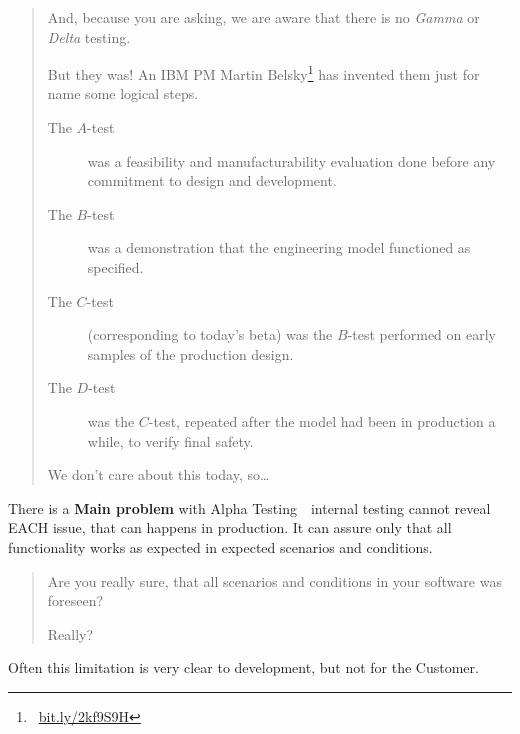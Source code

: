 \begin{quote}
And, because you are asking, we are aware that there is no \emph{Gamma} or \emph{Delta} testing. 

But they was! An IBM PM Martin Belsky\footnote{~\href{http://bit.ly/2kf9S9H}{bit.ly/2kf9S9H}} has invented them just for name some logical steps.

\begin{description}
\item[The $A$-test] was a feasibility and manufacturability evaluation done before any commitment to design and development.

\item[The $B$-test] was a demonstration that the engineering model functioned as specified. 

\item[The $C$-test] (corresponding to today's beta) was the $B$-test performed on early samples of the production design.

\item[The $D$-test] was the $C$-test, repeated after the model had been in production a while, to verify final safety.                                                                                                               \end{description}

We don't care about this today, so\ldots
\end{quote}

There is a \textbf{Main problem} with Alpha Testing~\textemdash~internal testing cannot reveal EACH issue, that can happens in production. It can assure only that all functionality works as expected in expected scenarios and conditions.

\begin{quote}
Are you really sure, that all scenarios and conditions in your software was foreseen?

Really?
\end{quote} 

Often this limitation is very clear to development, but not for the Customer.
